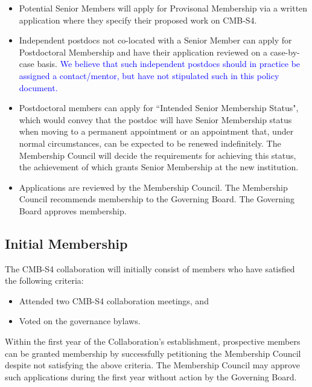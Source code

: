 \begin{itemize}

\item Potential Senior Members will apply for Provisonal Membership via a written application where they specify their proposed work on CMB-S4. 

\item Independent postdocs not co-located with a Senior Member can apply for Postdoctoral Membership and have their application reviewed on a case-by-case basis. \textcolor{blue}{We believe that such independent postdocs should in practice be assigned a contact/mentor, but have not stipulated such in this policy document.}  

\item Postdoctoral members can apply for ``Intended Senior Membership Status", which would convey that the postdoc will have Senior Membership status when moving to a permanent appointment or an appointment that, under normal circumstances, can be expected to be renewed indefinitely.  The Membership Council will decide the requirements for achieving this status, the achievement of which grants Senior Membership at the new institution.

\item Applications are reviewed by the Membership Council. The Membership Council recommends membership to the Governing Board.  The Governing Board approves membership.

\end{itemize}

\subsection{Initial Membership}
The CMB-S4 collaboration will initially consist of members who have satisfied the following criteria:

\begin{itemize}
\item Attended two CMB-S4 collaboration meetings, and 

\item Voted on the governance bylaws.
\end{itemize}

Within the first year of the Collaboration's establishment, prospective members can be granted membership by successfully petitioning the Membership Council despite not satisfying the above criteria.  The Membership Council may approve such applications during the first year without action by the Governing Board.  

